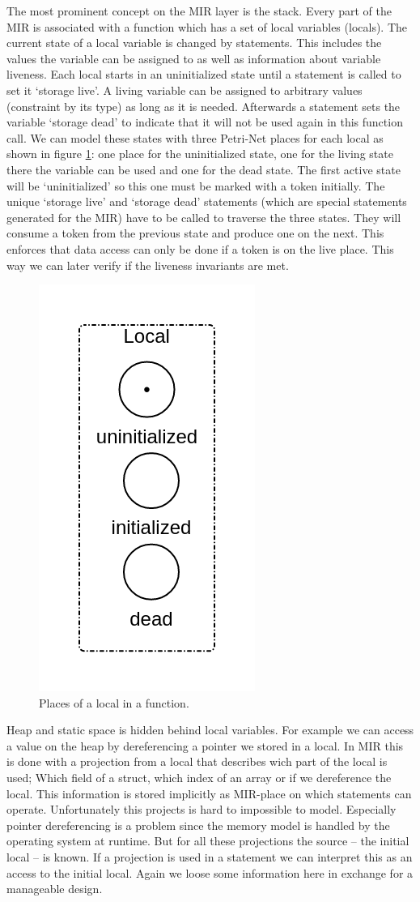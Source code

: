 The most prominent concept on the MIR layer is the stack.
Every part of the MIR is associated with a function which has a set of local variables (locals).
The current state of a local variable is changed by statements.
This includes the values the variable can be assigned to as well as information about variable liveness.
Each local starts in an uninitialized state until a statement is called to set it `storage live'.
A living variable can be assigned to arbitrary values (constraint by its type) as long as it is needed.
Afterwards a statement sets the variable `storage dead' to indicate that it will not be used again in this function call.
We can model these states with three Petri-Net places for each local as shown in figure \ref{local}: one place for the uninitialized state, one for the living state there the variable can be used and one for the dead state.
The first active state will be `uninitialized' so this one must be marked with a token initially.
The unique `storage live' and `storage dead' statements (which are special statements generated for the MIR) have to be called to traverse the three states.
They will consume a token from the previous state and produce one on the next.
This enforces that data access can only be done if a token is on the live place.
This way we can later verify if the liveness invariants are met.
\begin{figure}
    \centering
    \includegraphics[width=.2\textwidth]{../diagrams/local.png}
    \caption{Places of a local in a function.}
    \label{local}
\end{figure}

Heap and static space is hidden behind local variables.
For example we can access a value on the heap by dereferencing a pointer we stored in a local.
In MIR this is done with a projection from a local that describes wich part of the local is used;
Which field of a struct, which index of an array or if we dereference the local.
This information is stored implicitly as MIR-place on which statements can operate.
Unfortunately this projects is hard to impossible to model.
Especially pointer dereferencing is a problem since the memory model is handled by the operating system at runtime.
But for all these projections the source -- the initial local -- is known.
If a projection is used in a statement we can interpret this as an access to the initial local.
Again we loose some information here in exchange for a manageable design.

